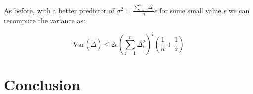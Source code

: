 \documentclass[11pt]{article}
\begin{document}
As before, with a better predictor of $\sigma^2 = \frac{\sum_{i = 1}^{n}\Delta_i^2}{n} \epsilon$ for some small value $\epsilon$ we can recompute the variance as:

\[
\mathrm{Var}(\tilde{\Delta}) \leq 2\epsilon(\sum_{i = 1}^{n}\Delta_i^2)^2(\frac{1}{n} + \frac{1}{s})
\]

\newpage

\section{Conclusion}

\newpage



\end{document}
